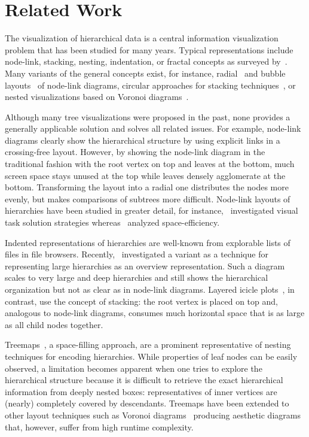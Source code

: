 \documentclass[journal]{vgtc}                %
\begin{document}
\section{Related Work}

The visualization of hierarchical data is a central information visualization problem that has been studied for many years. Typical representations include node-link, stacking, nesting, indentation, or fractal concepts as surveyed by~\cite{Schulz:11,Schulz_CGA:11}. Many variants of the general concepts exist, for instance, radial~\cite{Battista:99,Eades:92} and bubble layouts~\cite{Grivet:04,Lin:07} of node-link diagrams, circular approaches for stacking techniques~\cite{Andrews:98,Stasko:00,Yang:03}, or nested visualizations based on Voronoi diagrams~\cite{Balzer:05,Nocaj:12}.

Although many tree visualizations were proposed in the past, none provides a generally applicable solution and solves all related issues. For example, node-link diagrams clearly show the hierarchical structure by using explicit links in a crossing-free layout. However, by showing the node-link diagram in the traditional fashion with the root vertex on top and leaves at the bottom, much screen space stays unused at the top while leaves densely agglomerate at the bottom. Transforming the layout into a radial one distributes the nodes more evenly, but makes comparisons of subtrees more difficult. Node-link layouts of hierarchies have been studied in greater detail, for instance,~\cite{Burch:11} investigated visual task solution strategies whereas~\cite{McGuffin:09} analyzed space-efficiency. 

Indented representations of hierarchies are well-known from explorable lists of files in file browsers. Recently,~\cite{Burch_ISVC:10} investigated a variant as a technique for representing large hierarchies as an overview representation. Such a diagram scales to very large and deep hierarchies and still shows the hierarchical organization but not as clear as in node-link diagrams. Layered icicle plots~\cite{Kruskal:83}, in contrast, use the concept of stacking: the root vertex is placed on top and, analogous to node-link diagrams, consumes much horizontal space that is as large as all child nodes together.

Treemaps~\cite{Shneiderman:92}, a space-filling approach, are a prominent representative of nesting techniques for encoding hierarchies. While properties of leaf nodes can be easily observed, a limitation becomes apparent when one tries to explore the hierarchical structure because it is difficult to retrieve the exact hierarchical information from deeply nested boxes: representatives of inner vertices are (nearly) completely covered by descendants. Treemaps have been extended to other layout techniques such as Voronoi diagrams~\cite{Balzer:05,Nocaj:12} producing aesthetic diagrams that, however, suffer from high runtime complexity. 
\end{document}
